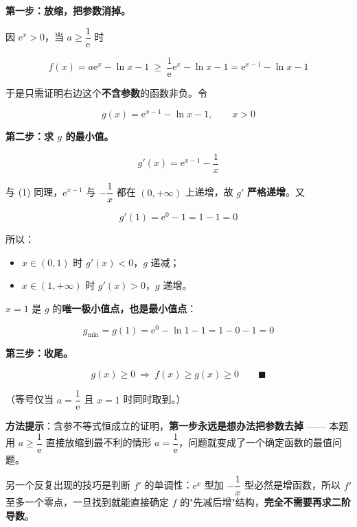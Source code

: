 

\textbf{第一步：放缩，把参数消掉。}

因 $\mathrm e^{x}>0$，当 $a\ge\dfrac1{\mathrm e}$ 时

\[f(x)=a\mathrm e^{x}-\ln x-1\ \ge\ \frac1{\mathrm e}\mathrm e^{x}-\ln x-1=\mathrm e^{x-1}-\ln x-1\]

于是只需证明右边这个\textbf{不含参数}的函数非负。令

\[g(x)=\mathrm e^{x-1}-\ln x-1,\qquad x>0\]

\textbf{第二步：求 $g$ 的最小值。}

\[g'(x)=\mathrm e^{x-1}-\frac1x\]

与 (1) 同理，$\mathrm e^{x-1}$ 与 $-\dfrac1x$ 都在 $(0,+\infty)$ 上递增，故 $g'$ \textbf{严格递增}。又

\[g'(1)=\mathrm e^{0}-1=1-1=0\]

所以：

\begin{itemize}
\item $x\in(0,1)$ 时 $g'(x)<0$，$g$ 递减；
\item $x\in(1,+\infty)$ 时 $g'(x)>0$，$g$ 递增。
\end{itemize}

$x=1$ 是 $g$ 的\textbf{唯一极小值点，也是最小值点}：

\[g_{\min}=g(1)=\mathrm e^{0}-\ln1-1=1-0-1=0\]

\textbf{第三步：收尾。}

\[g(x)\ge0\ \Longrightarrow\ f(x)\ge g(x)\ge0\qquad\blacksquare\]

（等号仅当 $a=\dfrac1{\mathrm e}$ 且 $x=1$ 时同时取到。）

\begin{gktip}
\textbf{方法提示}：含参不等式恒成立的证明，\textbf{第一步永远是想办法把参数去掉} —— 本题用 $a\ge\dfrac1{\mathrm e}$ 直接放缩到最不利的情形 $a=\dfrac1{\mathrm e}$，问题就变成了一个确定函数的最值问题。

另一个反复出现的技巧是判断 $f'$ 的单调性：$\mathrm e^{x}$ 型加 $-\dfrac1x$ 型必然是增函数，所以 $f'$ 至多一个零点，一旦找到就能直接确定 $f$ 的"先减后增"结构，\textbf{完全不需要再求二阶导数}。
\end{gktip}

\par\medskip


